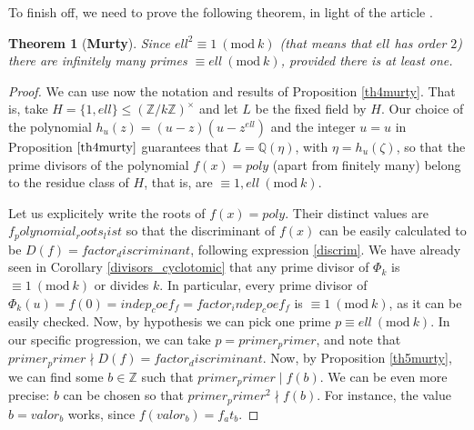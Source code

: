 \documentclass[a4paper, 12pt]{article}
\newtheorem{theorem}{Theorem}%
\theoremstyle{definition}
\theoremstyle{remark}
\newcommand{\Z}{\ensuremath{\mathbb{Z}}}
\newcommand{\Q}{\ensuremath{\mathbb{Q}}}
\newcommand{\Mod}[1]{\ (\mathrm{mod}\ #1)} %
\begin{document}
To finish off, we need to prove the following theorem, in light of the article \cite{Murty}.
\begin{theorem}[\textbf{Murty}]
	Since ${ell}^2\equiv 1\Mod{{k}}$ (that means that ${ell}$ has order $2$) there are infinitely many primes $\equiv {ell} \Mod{{k}}$, provided there is at least one.
\end{theorem}
\begin{proof}
We can use now the notation and results of Proposition \ref{th4murty}. That is, take $H=\{1,{ell}\}\leqslant(\Z/{k}\Z)^\times$ and let $L$ be the fixed field by $H$. Our choice of the polynomial $h_u(z)=(u-z)(u-z^{{ell}})$ and the integer $u={{u}}$ in Proposition $\ref{th4murty}$ guarantees that $L=\Q(\eta)$, with $\eta=h_{{u}}(\zeta)$, so that the prime divisors of the polynomial $f(x)={poly}$ (apart from finitely many) belong to the residue class of $H$, that is, are $\equiv 1,{ell} \Mod{{k}}$.

Let us explicitely write the roots of $f(x)={poly}$. Their distinct values are ${f_polynomial_roots_list}$ so that the discriminant of $f(x)$ can be easily calculated to be $D(f)={factor_discriminant}$, following expression \eqref{discrim}. We have already seen in Corollary \ref{divisors_cyclotomic} that any prime divisor of $\Phi_{{k}}$ is $\equiv 1 \Mod{{k}}$ or divides ${k}$. In particular, every prime divisor of $\Phi_{{k}}({u})=f(0)={indep_coef_f}={factor_indep_coef_f}$ is $\equiv 1 \Mod{{k}}$, as it can be easily checked. Now, by hypothesis we can pick one prime $p\equiv {ell}\Mod{{k}}$. In our specific progression, we can take $p={primer_primer}$, and note that ${primer_primer} \nmid D(f)={factor_discriminant}$.
	Now, by Proposition \ref{th5murty}, we can find some $b\in\Z$ such that ${primer_primer}\mid f(b)$. We can be even more precise: $b$ can be chosen so that ${primer_primer}^2\nmid f(b)$. For instance, the value $b={valor_b}$ works, since $f({valor_b})={f_at_b}$.
	

\end{proof}
\end{document}
